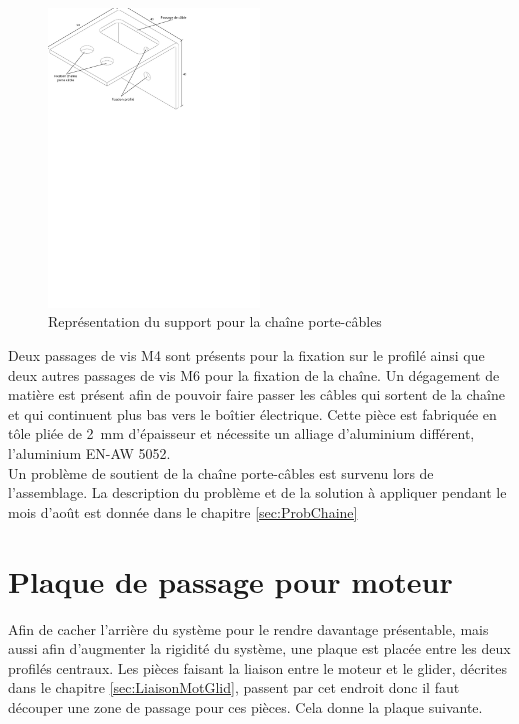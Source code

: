 \begin{figure}[H]
    \centering
    \includegraphics[width = 0.5\textwidth]{assets/figures/SupportChaineCable.svg}
    \caption{Représentation du support pour la chaîne porte-câbles}
    \label{fig:SupChaineCable}
\end{figure}

Deux passages de vis M4 sont présents pour la fixation sur le profilé ainsi que deux autres passages de vis M6 pour la fixation de la chaîne.
Un dégagement de matière est présent afin de pouvoir faire passer les câbles qui sortent de la chaîne et qui continuent plus bas vers le boîtier
électrique. Cette pièce est fabriquée en tôle pliée de 2~mm d'épaisseur et nécessite un alliage d'aluminium différent, l'aluminium EN-AW 5052.\\

Un problème de soutient de la chaîne porte-câbles est survenu lors de l'assemblage. La description du problème et de la solution à appliquer
pendant le mois d'août est donnée dans le chapitre \ref{sec:ProbChaine}

\section{Plaque de passage pour moteur}\label{sec:PlaPassMot}
Afin de cacher l'arrière du système pour le rendre davantage présentable, mais aussi afin d'augmenter la rigidité du système, une plaque est placée
entre les deux profilés centraux. Les pièces faisant la liaison entre le moteur et le glider, décrites dans le chapitre \ref{sec:LiaisonMotGlid},
passent par cet endroit donc il faut découper une zone de passage pour ces pièces. Cela donne la plaque suivante.

